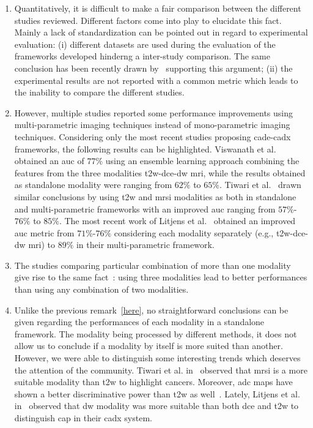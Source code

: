 \begin{enumerate}
\item Quantitatively, it is difficult to make a fair comparison between the different studies reviewed. Different factors come into play to elucidate this fact. Mainly a lack of standardization can be pointed out in regard to experimental evaluation: (i) different datasets are used during the evaluation of the frameworks developed hinderng a  inter-study comparison. The same conclusion has been recently drawn by~\cite{Litjens2014} supporting this argument; (ii) the experimental results are not reported with a common metric which leads to the inability to compare the different studies.

\item \label{here} However, multiple studies reported some performance improvements using multi-parametric imaging techniques instead of mono-parametric imaging techniques. Considering only the most recent studies proposing \ac{cade}-\ac{cadx} frameworks, the following results can be highlighted. Viswanath et al.~\cite{Viswanath2011} obtained an \ac{auc} of $77\%$ using an ensemble learning approach combining the features from the three modalities \ac{t2w}-\ac{dce}-\ac{dw} \ac{mri}, while the results obtained as standalone modality were ranging from $62\%$ to $65\%$. 
 Tiwari et al.~\cite{Tiwari2013} drawn similar conclusions by using \ac{t2w} and \ac{mrsi} modalities as both in standalone and multi-parametric frameworks with an improved \ac{auc} ranging from $57\%$-$76\%$ to $85\%$. The most recent work of Litjens et al.~\cite{Litjens2014} obtained an improved \ac{auc} metric from $71\%$-$76\%$ considering each modality separately (e.g., \ac{t2w}-\ac{dce}-\ac{dw} \ac{mri}) to $89\%$ in their multi-parametric framework.

\item The studies comparing particular combination of more than one modality give rise to the same fact~\cite{Ozer2010,Litjens2011,Liu2013,Litjens2014}: using three modalities lead to better performances than using any combination of two modalities. 

\item Unlike the previous remark~\ref{here}, no straightforward conclusions can be given regarding the performances of each modality in a standalone framework. The modality being processed by different methods, it does not allow us to conclude if a modality by itself is more suited than another. However, we were able to distinguish some interesting trends which deserves the attention of the community. Tiwari et al. in~\cite{Tiwari2009a,Tiwari2012,Tiwari2013} observed that \ac{mrsi} is a more suitable modality than \ac{t2w} to highlight cancers. Moreover, \ac{adc} maps have shown a better discriminative power than \ac{t2w} as well~\cite{Langer2009,Viswanath2011,Peng2013}. Lately, Litjens et al. in~\cite{Litjens2014} observed that \ac{dw} modality was more suitable than both \ac{dce} and \ac{t2w} to distinguish \ac{cap} in their \ac{cadx} system. 


\end{enumerate}
